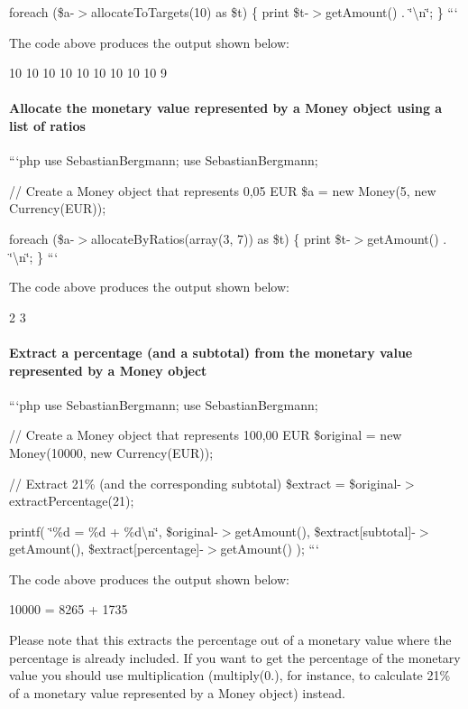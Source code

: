 foreach (\$a-\/$>$allocate\+To\+Targets(10) as \$t) \{ print \$t-\/$>$get\+Amount() . \char`\"{}\textbackslash{}n\char`\"{}; \} ```

The code above produces the output shown below\+: \begin{DoxyVerb}10
10
10
10
10
10
10
10
10
9
\end{DoxyVerb}


\paragraph*{Allocate the monetary value represented by a Money object using a list of ratios}

```php use Sebastian\+Bergmann; use Sebastian\+Bergmann;

// Create a Money object that represents 0,05 E\+U\+R \$a = new Money(5, new Currency(\textquotesingle{}E\+U\+R\textquotesingle{}));

foreach (\$a-\/$>$allocate\+By\+Ratios(array(3, 7)) as \$t) \{ print \$t-\/$>$get\+Amount() . \char`\"{}\textbackslash{}n\char`\"{}; \} ```

The code above produces the output shown below\+: \begin{DoxyVerb}2
3
\end{DoxyVerb}


\paragraph*{Extract a percentage (and a subtotal) from the monetary value represented by a Money object}

```php use Sebastian\+Bergmann; use Sebastian\+Bergmann;

// Create a Money object that represents 100,00 E\+U\+R \$original = new Money(10000, new Currency(\textquotesingle{}E\+U\+R\textquotesingle{}));

// Extract 21\% (and the corresponding subtotal) \$extract = \$original-\/$>$extract\+Percentage(21);

printf( \char`\"{}\%d = \%d + \%d\textbackslash{}n\char`\"{}, \$original-\/$>$get\+Amount(), \$extract\mbox{[}\textquotesingle{}subtotal\textquotesingle{}\mbox{]}-\/$>$get\+Amount(), \$extract\mbox{[}\textquotesingle{}percentage\textquotesingle{}\mbox{]}-\/$>$get\+Amount() ); ```

The code above produces the output shown below\+: \begin{DoxyVerb}10000 = 8265 + 1735
\end{DoxyVerb}


Please note that this extracts the percentage out of a monetary value where the percentage is already included. If you want to get the percentage of the monetary value you should use multiplication ({\ttfamily multiply(0.)}, for instance, to calculate 21\% of a monetary value represented by a Money object) instead. 